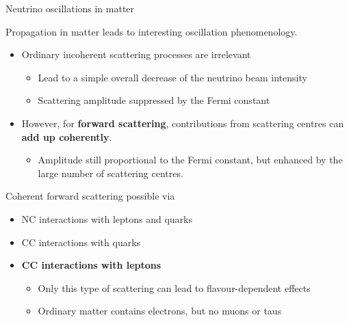 \begin{frame}{Neutrino oscillations in matter}

Propagation in matter leads to interesting oscillation phenomenology.

\begin{itemize}
\item Ordinary incoherent scattering processes are irrelevant
     \begin{itemize}
        \item Lead to a simple overall decrease of the neutrino beam intensity
        \item Scattering amplitude suppressed by the Fermi constant
      \end{itemize}
\item However, {\color{magenta}
      for {\bf forward scattering}, contributions
      from scattering centres can {\bf add up coherently}}.
      \begin{itemize}
         \item Amplitude still proportional to the Fermi constant,
               but enhanced by the large number of scattering centres.\\
      \end{itemize}
\end{itemize}

\vspace{0.2cm}
Coherent forward scattering possible via
\begin{itemize}
  \item NC interactions with leptons and quarks
  \item CC interactions with quarks
  \item {\color{magenta} \bf CC interactions with leptons}
  \begin{itemize}
    \item Only this type of scattering can lead to flavour-dependent effects
    \item Ordinary matter contains electrons, but no muons or taus
  \end{itemize}
\end{itemize}

\end{frame}


%
%

